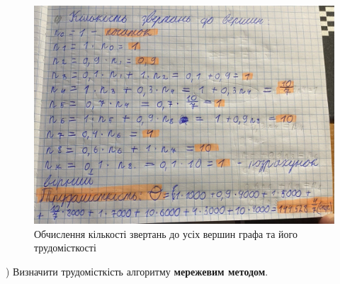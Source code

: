 \begin{figure}[h]
    \centering
    \includegraphics[width=16cm]{reports/algos/lab1/assets/7.jpg}
    \caption{Обчислення кількості звертань до усіх вершин графа та його трудомісткості}
\end{figure}

) Визначити трудомісткість алгоритму \textbf{мережевим методом}.

